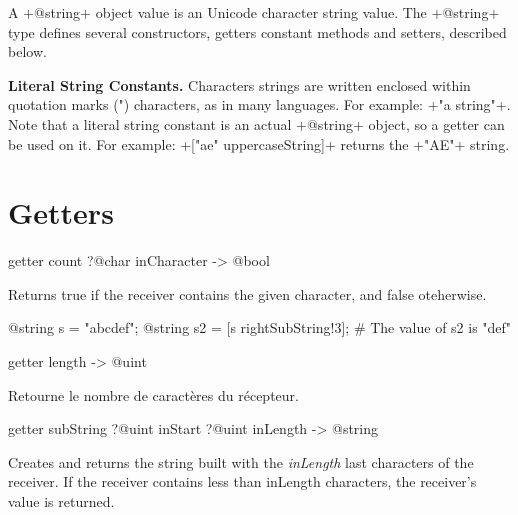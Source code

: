 

A \ggs+@string+ object value is an Unicode character string value. The \ggs+@string+ type defines several constructors, getters constant methods and setters, described below.

\textbf{Literal String Constants.} Characters strings are written enclosed within quotation marks (") characters, as in many languages. For example: \ggs+"a string"+. Note that a literal string constant is an actual \ggs+@string+ object, so a getter can be used on it. For example: \ggs+["ae" uppercaseString]+ returns the \ggs+"AE"+ string.

\section{Getters}








\begin{galgas}
getter count ?@char inCharacter -> @bool
\end{galgas}
Returns true if the receiver contains the given character, and false oteherwise.

\begin{galgas}
@string s = "abcdef";
@string s2 = [s rightSubString!3]; # The value of s2 is "def"
\end{galgas}







\begin{galgas}
getter length -> @uint
\end{galgas}

Retourne le nombre de caractères du récepteur.









\begin{galgas}
getter subString ?@uint inStart ?@uint inLength -> @string
\end{galgas}

Creates and returns the string built with the \emph{inLength} last characters of the receiver. If the receiver contains less than inLength characters, the receiver’s value is returned.




